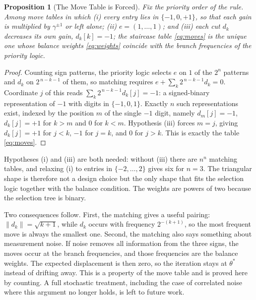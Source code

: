 \documentclass[letterpaper, 10pt, conference, twocolumn]{ieeeconf}
\newtheorem{proposition}{Proposition}
\begin{document}
\begin{proposition}[The Move Table is Forced]
\label{prop:unique}
Fix the priority order of the rule. Among move tables in which
(i) every entry lies in $\{-1, 0, +1\}$, so that each gain is multiplied by
$\gamma^{\pm 1}$ or left alone; (ii) $e = (1, \dots, 1)$; and (iii) each
cut $d_k$ decreases its own gain, $d_k[k] = -1$; the staircase table
\eqref{eq:moves} is the \emph{unique} one whose balance weights
\eqref{eq:weights} coincide with the branch frequencies of the priority
logic.
\end{proposition}

\begin{proof}
Counting sign patterns, the priority logic selects $e$ on $1$ of the $2^n$
patterns and $d_k$ on $2^{\,n-k-1}$ of them, so matching requires
$e + \sum_k 2^{\,n-k-1} d_k = 0$. Coordinate $j$ of this reads
$\sum_k 2^{\,n-k-1} d_k[j] = -1$: a signed-binary representation of $-1$ with
digits in $\{-1,0,1\}$. Exactly $n$ such representations exist, indexed by the
position $m$ of the single $-1$ digit, namely $d_m[j] = -1$, $d_k[j] = +1$
for $k > m$ and $0$ for $k < m$. Hypothesis (iii) forces $m = j$, giving
$d_k[j] = +1$ for $j < k$, $-1$ for $j = k$, and $0$ for $j > k$. This is
exactly the table \eqref{eq:moves}.
\end{proof}

Hypotheses (i) and (iii) are both needed: without (iii) there are $n^n$
matching tables, and relaxing (i) to entries in $\{-2, \dots, 2\}$ gives six for
$n = 3$. The triangular shape is therefore not a design choice but the only
shape that fits the selection logic together with the balance condition. The
weights are powers of two because the selection tree is binary.

Two consequences follow. First, the matching gives a useful pairing:
$\lVert d_k \rVert = \sqrt{k+1}$, while $d_k$ occurs with frequency
$2^{-(k+1)}$, so the most frequent move is always the smallest one. Second,
the matching also says something about measurement noise. If noise removes all information from the three signs, the moves occur
at the branch frequencies, and those frequencies are the balance weights. The
expected displacement is then zero, so the iteration stays at $\theta^*$
instead of drifting away. This is a property of the move table and is proved
here by counting. A full stochastic treatment, including the case of
correlated noise where this argument no longer holds, is left to future work.

\end{document}
